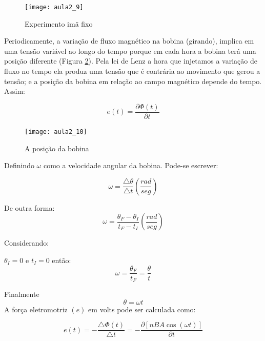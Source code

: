 \begin{figure}[H]
\begin{centering}
\texttt{[image: aula2\_9]}\protect\caption{\label{fig:aula2_9}Experimento imã fixo }
\end{centering}

\end{figure}

Periodicamente, a variação de fluxo magnético na bobina (girando),
implica em uma tensão variável ao longo do tempo porque em cada hora
a bobina terá uma posição diferente (Figura \ref{fig:aula2_10}). Pela lei de Lenz a hora que injetamos
a variação de fluxo no tempo ela produz uma tensão que é contrária
ao movimento que gerou a tensão; e a posição da bobina em relação ao
campo magnético depende do tempo. Assim:

\begin{equation}\label{eq:et}
e(t)=\frac{\partial\Phi(t)}{\partial t}
\end{equation}

\begin{figure}[H]
\begin{centering}
\texttt{[image: aula2\_10]}\protect\caption{\label{fig:aula2_10}A posição da bobina }
\end{centering}

\end{figure}
Definindo $\omega$ como a velocidade angular da bobina. Pode-se escrever:

\begin{equation}\label{eq:omega}
\omega=\frac{\triangle\theta}{\triangle t}(\frac{rad}{seg})
\end{equation}

De outra forma:
\begin{equation}\label{eq:omega2}
\omega=\frac{\theta_{F}-\theta_{I}}{t_{F}-t_{I}}(\frac{rad}{seg})
\end{equation}

Considerando:

$\theta_{I}=0$ e $t_{I}=0$ então:
\begin{equation}\label{eq:omega3}
\omega=\frac{\theta_{F}}{t_{F}}=\frac{\theta}{t}
\end{equation}

Finalmente
\begin{equation}\label{eq:omega4}
\theta=\omega t
\end{equation}
A força eletromotriz $(e)$ em volts pode ser calculada como:

\begin{equation}\label{eq:ele}
e(t)=-\frac{\triangle\Phi(t)}{\triangle t}=-\frac{\partial[nBA\cos(\omega t)]}{\partial t}
\end{equation}

